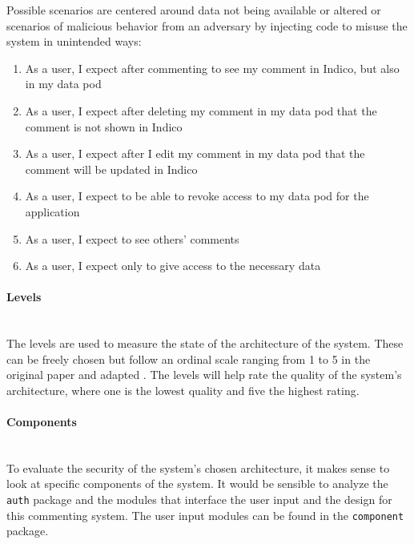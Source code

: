 Possible scenarios are centered around data not being available or altered or scenarios of malicious behavior from an adversary by injecting code to misuse the system in unintended ways:
\begin{enumerate}
    \item As a user, I expect after commenting to see my comment in Indico, but also in my data pod
    \item As a user, I expect after deleting my comment in my data pod that the comment is not shown in Indico
    \item As a user, I expect after I edit my comment in my data pod that the comment will be updated in Indico
    \item As a user, I expect to be able to revoke access to my data pod for the application
    \item As a user, I expect to see others' comments
    \item As a user, I expect only to give access to the necessary data
\end{enumerate}
\paragraph{Levels}\label{poc1-levels}\mbox{}\\

The levels are used to measure the state of the architecture of the system. These can be freely chosen but follow an ordinal scale ranging from 1 to 5 in the original paper and adapted \cite{asqa-paper}. The levels will help rate the quality of the system's architecture, where one is the lowest quality and five the highest rating.
\vspace{0.5cm}
\paragraph{Components}\mbox{}\\

To evaluate the security of the system's chosen architecture, it makes sense to look at specific components of the system. It would be sensible to analyze the \texttt{auth} package and the modules that interface the user input and the design for this commenting system. The user input modules can be found in the \texttt{component} package.

